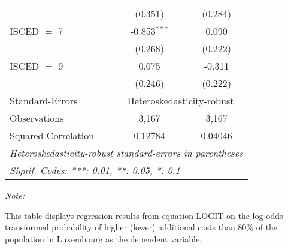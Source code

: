 \begin{table}[htbp!]
\begin{adjustbox}{width = 1\textwidth, max height = 0.95\textheight, center}
\begin{threeparttable}[b]
\begin{tabular}{lcc}
                                 & (0.351)        & (0.284)\\   
            ISCED $=$ 7          & -0.853$^{***}$ & 0.090\\   
                                 & (0.268)        & (0.222)\\   
            ISCED $=$ 9          & 0.075          & -0.311\\   
                                 & (0.246)        & (0.222)\\   
            \midrule 
            Standard-Errors & \multicolumn{2}{c}{Heteroskedasticity-robust} \\ 
            Observations         & 3,167          & 3,167\\  
            Squared Correlation  & 0.12784        & 0.04046\\  
            \midrule \midrule
            \multicolumn{3}{l}{\emph{Heteroskedasticity-robust standard-errors in parentheses}}\\
            \multicolumn{3}{l}{\emph{Signif. Codes: ***: 0.01, **: 0.05, *: 0.1}}\\
         \end{tabular}
         
         \begin{tablenotes}\item \medskip \textit{Note:}
            \item This table displays regression results from equation LOGIT on the log-odds transformed probability of higher (lower) additional costs than 80\% of the population in Luxembourg as the dependent variable. 
         \end{tablenotes}
      \end{threeparttable}
   \end{adjustbox}
\end{table}



